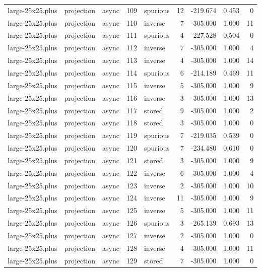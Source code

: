 \begin{tabular}{lllrlrrrr}
large-25x25.plus & projection & async & 109 & spurious & 12 & -219.674 & 0.453 & 0 \\
large-25x25.plus & projection & async & 110 & inverse & 7 & -305.000 & 1.000 & 11 \\
large-25x25.plus & projection & async & 111 & spurious & 4 & -227.528 & 0.504 & 0 \\
large-25x25.plus & projection & async & 112 & inverse & 7 & -305.000 & 1.000 & 4 \\
large-25x25.plus & projection & async & 113 & inverse & 4 & -305.000 & 1.000 & 14 \\
large-25x25.plus & projection & async & 114 & spurious & 6 & -214.189 & 0.469 & 11 \\
large-25x25.plus & projection & async & 115 & inverse & 5 & -305.000 & 1.000 & 9 \\
large-25x25.plus & projection & async & 116 & inverse & 3 & -305.000 & 1.000 & 13 \\
large-25x25.plus & projection & async & 117 & stored & 9 & -305.000 & 1.000 & 2 \\
large-25x25.plus & projection & async & 118 & stored & 3 & -305.000 & 1.000 & 0 \\
large-25x25.plus & projection & async & 119 & spurious & 7 & -219.035 & 0.539 & 0 \\
large-25x25.plus & projection & async & 120 & spurious & 7 & -234.480 & 0.610 & 0 \\
large-25x25.plus & projection & async & 121 & stored & 3 & -305.000 & 1.000 & 9 \\
large-25x25.plus & projection & async & 122 & inverse & 6 & -305.000 & 1.000 & 4 \\
large-25x25.plus & projection & async & 123 & inverse & 2 & -305.000 & 1.000 & 10 \\
large-25x25.plus & projection & async & 124 & inverse & 11 & -305.000 & 1.000 & 9 \\
large-25x25.plus & projection & async & 125 & inverse & 5 & -305.000 & 1.000 & 11 \\
large-25x25.plus & projection & async & 126 & spurious & 3 & -265.139 & 0.693 & 13 \\
large-25x25.plus & projection & async & 127 & inverse & 2 & -305.000 & 1.000 & 0 \\
large-25x25.plus & projection & async & 128 & inverse & 4 & -305.000 & 1.000 & 11 \\
large-25x25.plus & projection & async & 129 & stored & 7 & -305.000 & 1.000 & 0 \\

\end{tabular}
